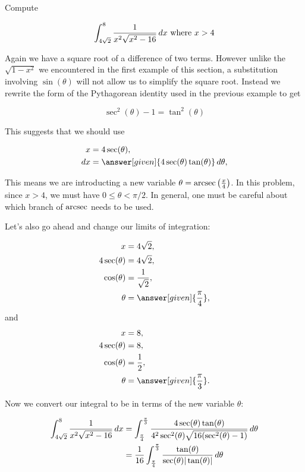 \documentclass{ximera}
\begin{document}
\begin{example}
Compute 

\[
\int_{4\sqrt{2}}^{8} \frac{1}{ x^{2}\sqrt{x^{2}-16}} \mathop{}\!d x \text{ where } x > 4
\]

\begin{explanation}
Again we have a square root of a difference of two terms. However unlike the $\sqrt{1-x^{2}}$ we encountered 
in the first example of this section, a substitution involving $\sin(\theta)$ will not allow us to simplify 
the square root. Instead we rewrite the form of the Pythagorean identity used in the previous example to get 

\[
\sec^{2}(\theta)-1=\tan^{2}(\theta)
\]

This suggests that we should use 

 \begin{align*}
      x &= 4\sec(\theta),\\
      \d x &= \answer[given]{4\sec(\theta)\tan(\theta)} \d \theta,
    \end{align*}

\begin{remark}
This means we are introducting a new variable $\theta=\operatorname{arcsec}\left(\frac{x}{4}\right)$. 
In this problem, since $x > 4$, we must have $0 \leq \theta < \pi/2 $.  In general, one must be careful about which branch of $\operatorname{arcsec}$ needs to be used. 
\end{remark}
Let's also go ahead and change our limits of integration:


    \begin{align*}
      x &= 4\sqrt{2},\\
     4 \sec(\theta) &=4\sqrt{2},\\
       \cos(\theta)&=\frac{1}{\sqrt{2}}, \\
      \theta &= \answer[given]{\frac{\pi}{4}},
    \end{align*}
    and
    \begin{align*}
      x &= 8,\\
     4 \sec(\theta) &= 8,\\
        \cos(\theta)&=\frac{1}{2}, \\
      \theta &= \answer[given]{\frac{\pi}{3}}.
    \end{align*}


Now we convert our integral to be in terms of the new variable $\theta$:

    \begin{align*}
      \int_{4\sqrt{2}}^{8} \frac{1}{x^{2}\sqrt{x^{2}-16}} \mathop{}\!d x &= \int_{\frac{\pi}{4}}^{\frac{\pi}{3}} \frac{ 4\sec(\theta)\tan(\theta)}{ 4^{2}\sec^{2}(\theta) \sqrt{ 16(\sec^{2}(\theta)-1) }} \mathop{}\!d \theta \\
      &=\frac{1}{16}\int_{\frac{\pi}{4}}^{\frac{\pi}{3}} \frac{\tan(\theta)}{\sec(\theta) |\tan(\theta)|}  \mathop{}\!d \theta
          \end{align*}


\end{explanation}
\end{example}
\end{document}
